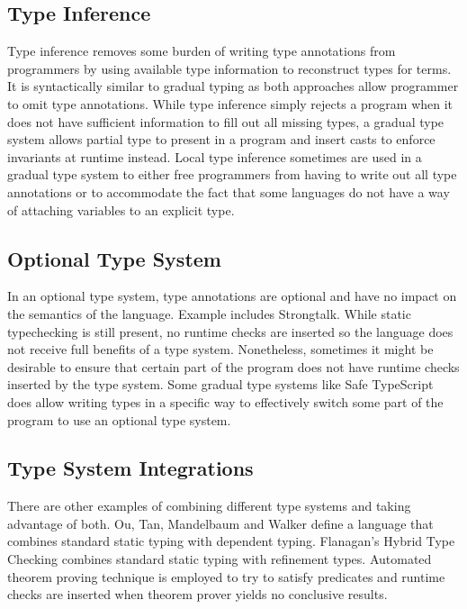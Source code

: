 \subsection{Type Inference}
Type inference \cite{damas1982principal,hindley1969principle,milner1978theory}
removes some burden of writing type annotations from programmers
by using available type information to reconstruct types for terms.
It is syntactically similar to gradual typing as both approaches
allow programmer to omit type annotations.
While type inference simply rejects a program when it
does not have sufficient information to fill out all missing types,
a gradual type system allows partial type to present in a program and insert casts
to enforce invariants at runtime instead.
Local type inference \cite{pierce2000local} sometimes are used in a gradual type
system to either free programmers from having to write out all type annotations
or to accommodate the fact that some languages do not have a way of attaching
variables to an explicit type.

\subsection{Optional Type System}

In an optional type system\cite{bracha2004pluggable},
type annotations are optional and have no impact on the semantics of the language.
Example includes Strongtalk\cite{bracha1993strongtalk}.
While static typechecking is still present, no runtime checks are inserted
so the language does not receive full benefits of a type system.
Nonetheless, sometimes it might be desirable to ensure that certain part of the program
does not have runtime checks inserted by the type system.
Some gradual type systems like Safe TypeScript\cite{rastogi2015safe} does allow writing
types in a specific way to effectively switch some part of the program to use an optional type system.

\subsection{Type System Integrations}

There are other examples of combining different type systems and taking advantage of both.
Ou, Tan, Mandelbaum and Walker\cite{ou2004dynamic} define a language that combines
standard static typing with dependent typing.
Flanagan's Hybrid Type Checking\cite{flanagan2006hybrid} combines standard static typing
with refinement types. Automated theorem proving technique is employed to try to satisfy predicates
and runtime checks are inserted when theorem prover yields no conclusive results.


